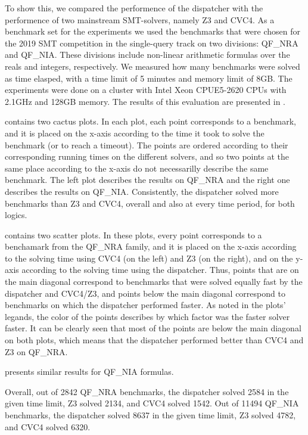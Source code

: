 \documentclass{article}
\begin{document}
To show this, we compared the performence of the dispatcher
with the performence of two mainstream SMT-solvers,
namely Z3 and CVC4.
As a benchmark set for the experiments we used the benchmarks that were chosen for the 2019 SMT competition in the single-query track on two divisions:
QF\_NRA and QF\_NIA.
These divisions include non-linear arithmetic formulas
over the reals and integers, respectively.
We measured how many benchmarks were solved as time
elasped, with
a time limit of 5 minutes and memory limit of 8GB.
%
The experiments were done on
a cluster with Intel Xeon CPUE5-2620 CPUs with 2.1GHz and 128GB memory.
The results of this evaluation are presented in
.

 contains two cactus plots.
In each plot, each point corresponds to a benchmark, and it
is placed on the x-axis according to the time
it took to solve the benchmark (or to reach a timeout).
The points are ordered according to their corresponding
running times on the different solvers, and so
two points at the same place according to the x-axis
do not necessarilly describe the same benchmark.
The left plot describes the results on QF\_NRA and
the right one describes the results on QF\_NIA.
Consistently, the dispatcher solved more benchmarks
than Z3 and CVC4, overall and also at every time period,
for both logics.

 contains two scatter plots.
In these plots, every point corresponds to a benchamark
from the QF\_NRA family,
and it is placed on the x-axis according to the
solving time using CVC4 (on the left) and Z3 (on the right),
and on the y-axis according to the solving time using
the dispatcher.
%
Thus, points that are on the main diagonal correspond to benchmarks that
were solved equally fast by the dispatcher and CVC4/Z3,
and points below the main diagonal correspond
to benchmarks on which the dispatcher performed
faster.
%
As noted in the plots' legands, the color of the points
describes by which factor was the faster solver faster.
%
It can be clearly seen that most of the points are below the main diagonal on both plots,
which means that the dispatcher performed better
than CVC4 and Z3 on QF\_NRA.

 presents similar results for QF\_NIA formulas.

Overall, out of 2842 QF\_NRA benchmarks,
the dispatcher solved 2584 in the given time limit,
Z3 solved 2134, and
CVC4 solved 1542.
%
Out of 11494 QF\_NIA benchmarks,
the dispatcher solved 8637 in the given time limit,
Z3 solved 4782, and
CVC4 solved 6320.
\end{document}
